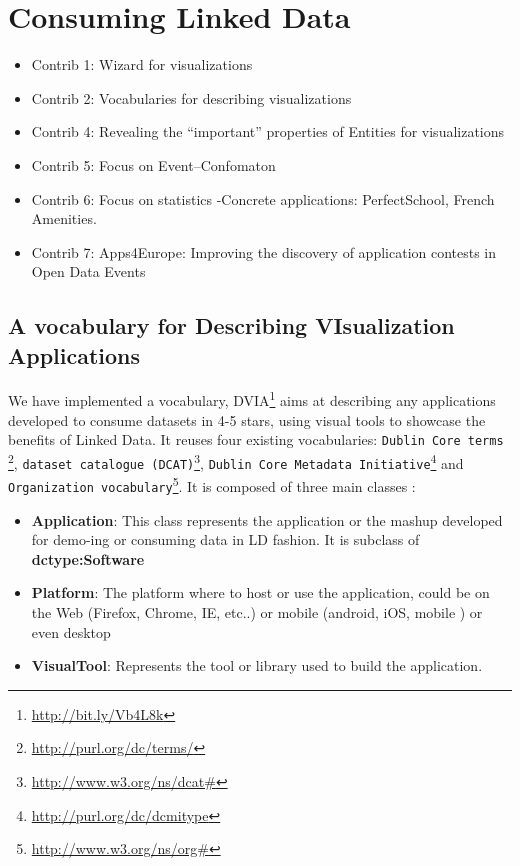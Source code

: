 \chapter{Consuming Linked Data}
\label{ch:ch5}

\begin{itemize}
\item Contrib 1: Wizard for visualizations

\item Contrib 2: Vocabularies for describing visualizations

\item Contrib 4: Revealing the “important” properties of Entities for visualizations

\item Contrib 5: Focus on Event--Confomaton
\item Contrib 6: Focus on statistics -Concrete applications: PerfectSchool, French Amenities.

\item Contrib 7: Apps4Europe: Improving the discovery of application contests in Open Data Events


\end{itemize}


\section{A vocabulary for Describing VIsualization Applications} \label{sec:dvia}

We have implemented a vocabulary, DVIA\footnote{\url{http://bit.ly/Vb4L8k}} aims at describing any applications developed to consume datasets in 4-5 stars, using visual tools to showcase the benefits of Linked Data. It reuses four existing vocabularies: \texttt{Dublin Core terms} \footnote{\url{http://purl.org/dc/terms/}}, \texttt{dataset catalogue (DCAT)}\footnote{\url{http://www.w3.org/ns/dcat#}}, \texttt{Dublin Core Metadata Initiative}\footnote{\url{http://purl.org/dc/dcmitype}} and \texttt{Organization vocabulary}\footnote{\url{http://www.w3.org/ns/org#}}.  It is composed of three main classes : 

\begin{itemize}
\item \textbf{Application}: This class represents the application or the mashup developed for demo-ing or consuming data in LD fashion. It is subclass of \textbf{dctype:Software}
\item \textbf{Platform}: The platform where to host or use the application, could be on the Web (Firefox, Chrome, IE, etc..) or mobile (android, iOS, mobile ) or even desktop
\item \textbf{VisualTool}: Represents the tool or library used to build the application. 
\end{itemize}

